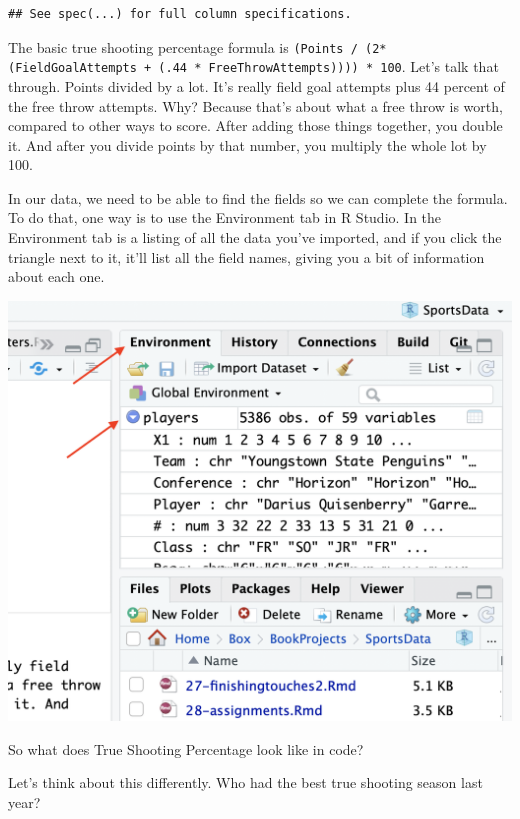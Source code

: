 \documentclass[
]{book}
\newenvironment{Shaded}{\begin{snugshade}}{\end{snugshade}}
\newcommand{\DataTypeTok}[1]{\textcolor[rgb]{0.13,0.29,0.53}{#1}}
\newcommand{\DecValTok}[1]{\textcolor[rgb]{0.00,0.00,0.81}{#1}}
\newcommand{\KeywordTok}[1]{\textcolor[rgb]{0.13,0.29,0.53}{\textbf{#1}}}
\newcommand{\NormalTok}[1]{#1}
\newcommand{\OperatorTok}[1]{\textcolor[rgb]{0.81,0.36,0.00}{\textbf{#1}}}
\newcommand{\StringTok}[1]{\textcolor[rgb]{0.31,0.60,0.02}{#1}}
\begin{document}
\begin{verbatim}
## See spec(...) for full column specifications.
\end{verbatim}

The basic true shooting percentage formula is \texttt{(Points\ /\ (2*(FieldGoalAttempts\ +\ (.44\ *\ FreeThrowAttempts))))\ *\ 100}. Let's talk that through. Points divided by a lot. It's really field goal attempts plus 44 percent of the free throw attempts. Why? Because that's about what a free throw is worth, compared to other ways to score. After adding those things together, you double it. And after you divide points by that number, you multiply the whole lot by 100.

In our data, we need to be able to find the fields so we can complete the formula. To do that, one way is to use the Environment tab in R Studio. In the Environment tab is a listing of all the data you've imported, and if you click the triangle next to it, it'll list all the field names, giving you a bit of information about each one.

\includegraphics[width=18.14in]{images/environment}

So what does True Shooting Percentage look like in code?

Let's think about this differently. Who had the best true shooting season last year?

\begin{Shaded}
\end{Shaded}
\end{document}
